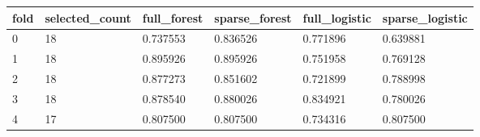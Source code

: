 \begin{tabular}{llllll}
\hline
fold & selected\_count & full\_forest & sparse\_forest & full\_logistic & sparse\_logistic \\
\hline
0 & 18 & 0.737553 & 0.836526 & 0.771896 & 0.639881 \\
1 & 18 & 0.895926 & 0.895926 & 0.751958 & 0.769128 \\
2 & 18 & 0.877273 & 0.851602 & 0.721899 & 0.788998 \\
3 & 18 & 0.878540 & 0.880026 & 0.834921 & 0.780026 \\
4 & 17 & 0.807500 & 0.807500 & 0.734316 & 0.807500 \\
\hline
\end{tabular}
